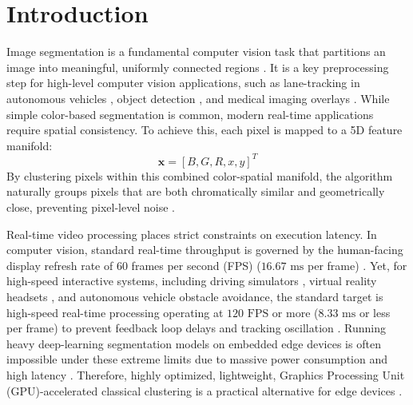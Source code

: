 \section{Introduction}\label{sec:intro}
Image segmentation is a fundamental computer vision task that partitions an image into meaningful, uniformly connected regions \cite{gonzalez2009digital}. It is a key preprocessing step for high-level computer vision applications, such as lane-tracking in autonomous vehicles \cite{janai2020computer}, object detection \cite{redmon2016you}, and medical imaging overlays \cite{pham2000current}. While simple color-based segmentation is common, modern real-time applications require spatial consistency. To achieve this, each pixel is mapped to a 5D feature manifold:
\begin{equation}
\mathbf{x} = [B, G, R, x, y]^T
\end{equation}
By clustering pixels within this combined color-spatial manifold, the algorithm naturally groups pixels that are both chromatically similar and geometrically close, preventing pixel-level noise \cite{achanta2012slic}.

Real-time video processing places strict constraints on execution latency. In computer vision, standard real-time throughput is governed by the human-facing display refresh rate of 60 frames per second (FPS) ($16.67\text{ ms}$ per frame) \cite{DHANANI20135}. Yet, for high-speed interactive systems, including driving simulators \cite{cruden2019simulator}, virtual reality headsets \cite{jerald2009scene}, and autonomous vehicle obstacle avoidance, the standard target is high-speed real-time processing operating at $120\text{ FPS}$ or more ($8.33\text{ ms}$ or less per frame) to prevent feedback loop delays and tracking oscillation \cite{cruden2019simulator, jerald2009scene}. Running heavy deep-learning segmentation models on embedded edge devices is often impossible under these extreme limits due to massive power consumption and high latency \cite{paszke2016enet}. Therefore, highly optimized, lightweight, Graphics Processing Unit (GPU)-accelerated classical clustering is a practical alternative for edge devices \cite{farivar2008parallel}.

